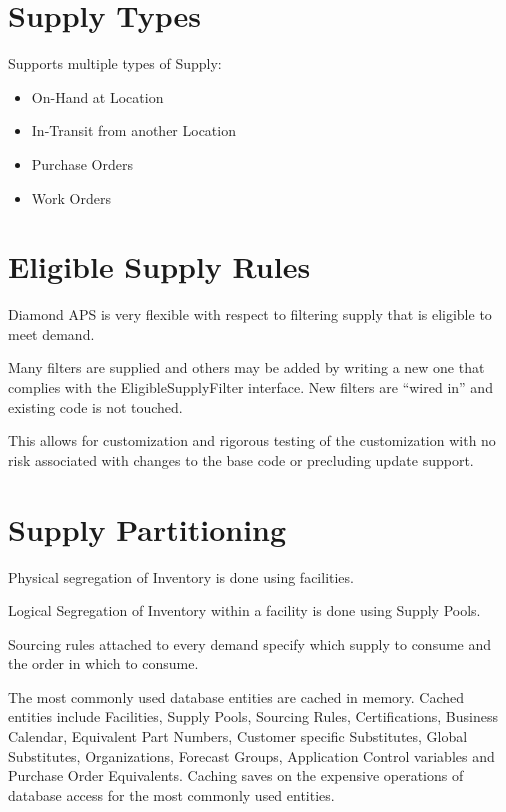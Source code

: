 \documentclass[letterpaper,10pt,english]{sphinxmanual}
\begin{document}
\section{Supply Types}
\label{APS/Introduction:supply-types}
Supports multiple types of Supply:
\begin{itemize}
\item {} 
On-Hand at Location

\item {} 
In-Transit from another Location

\item {} 
Purchase Orders

\item {} 
Work Orders

\end{itemize}


\section{Eligible Supply Rules}
\label{APS/Introduction:eligible-supply-rules}
Diamond APS is very flexible with respect to filtering supply that is eligible to meet demand.

Many filters are supplied and others may be added by writing a new one that complies with the
EligibleSupplyFilter interface.  New filters are ``wired in'' and existing code is not touched.

This allows for customization and rigorous testing of the customization with no risk associated with
changes to the base code or precluding update support.


\section{Supply Partitioning}
\label{APS/Introduction:supply-partitioning}
Physical segregation of Inventory is done using facilities.

Logical Segregation of Inventory within a facility is done using Supply
Pools.

Sourcing rules attached to every demand specify which supply to consume
and the order in which to consume.

The most commonly used database entities are cached in memory. Cached
entities include Facilities, Supply Pools, Sourcing Rules,
Certifications, Business Calendar, Equivalent Part Numbers, Customer
specific Substitutes, Global Substitutes, Organizations, Forecast
Groups, Application Control variables and Purchase Order Equivalents.
Caching saves on the expensive operations of database access for the
most commonly used entities.
\end{document}
